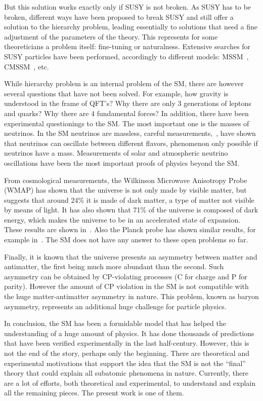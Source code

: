 But this solution works exactly only if SUSY is not broken. As SUSY has to be broken, different ways have been proposed to break SUSY and still offer a solution to the hierarchy problem, leading essentially to solutions that need a fine adjustment of the parameters of the theory. This represents for some theoreticians a problem itself: fine-tuning or naturalness. Extensive searches for SUSY particles have been performed, accordingly to different models: MSSM~\cite{Khachatryan:2014wca,Aad:2014vgg}, CMSSM~\cite{Agashe:2014kda}, etc.

While hierarchy problem is an internal problem of the SM, there are however several questions that have not been solved. For example, how gravity is understood in the frame of QFT's? Why there are only 3 generations of leptons and quarks? Why there are 4 fundamental forces? In addition, there have been experimental questionings to the SM. The most important one is the masses of neutrinos. In the SM neutrinos are massless, careful measurements,~\cite{Ashie:2004mr, Weinheimer:2013hya}, have shown that neutrinos can oscillate between different flavors, phenomenon only possible if neutrinos have a mass. Measurements of solar and atmospheric neutrino oscillations have been the most important proofs of physics beyond the SM. 

From cosmological measurements, the Wilkinson Microwave Anisotropy Probe (WMAP) has shown that the universe is not only made by visible matter, but suggests that around 24\% it is made of dark matter, a type of matter not visible by means of light. It has also shown that 71\% of the universe is composed of dark energy, which makes the universe to be in an accelerated state of expansion. These results are shown in~\cite{2013ApJS..208...20B, 2013ApJS..208...19H}. Also the Planck probe has shown similar results, for example in~\cite{Planck:2015xua}. The SM does not have any answer to these open problems so far. 

Finally, it is known that the universe presents an asymmetry between matter and antimatter, the first being much more abundant than the second. Such asymmetry can be obtained by CP-violating processes (C for charge and P for parity). However the amount of CP violation in the SM is not compatible with the huge matter-antimatter asymmetry in nature. This problem, known as baryon asymmetry, represents an additional huge challenge for particle physics. 

In conclusion, the SM has been a formidable model that has helped the understanding of a huge amount of physics. It has done thousands of predictions that have been verified experimentally in the last half-century. However, this is not the end of the story, perhaps only the beginning. There are theoretical and experimental motivations that support the idea that the SM is not the ``final'' theory that could explain all subatomic phenomena in nature. Currently, there are a lot of efforts, both theoretical and experimental, to understand and explain all the remaining pieces. The present work is one of them.

